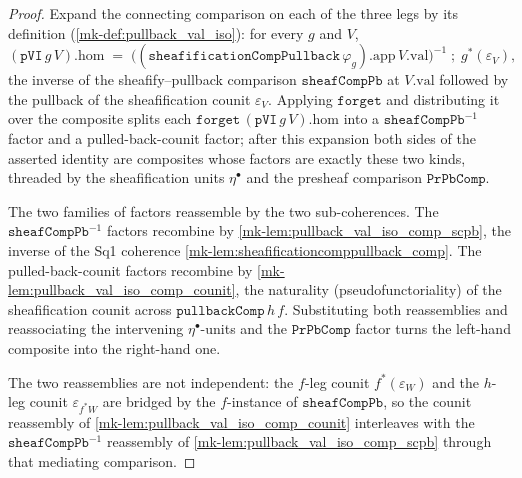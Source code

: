 \begin{proof}
  \leanok
  Expand the connecting comparison on each of the three legs by its definition
  (\ref{mk-def:pullback_val_iso}): for every \(g\) and \(V\),
  \[
    (\mathtt{pVI}\,g\,V).\mathrm{hom} \;=\;
      \bigl((\mathtt{sheafificationCompPullback}\,\varphi_g).\mathrm{app}\,V.\mathrm{val}\bigr)^{-1}
        \;\mathbin{;}\; g^{*}(\varepsilon_V),
  \]
  the inverse of the sheafify--pullback comparison \(\mathtt{sheafCompPb}\) at \(V.\mathrm{val}\)
  followed by the pullback of the sheafification counit \(\varepsilon_V\). Applying
  \(\mathtt{forget}\) and distributing it over the composite splits each
  \(\mathtt{forget}\,(\mathtt{pVI}\,g\,V).\mathrm{hom}\) into a \(\mathtt{sheafCompPb}^{-1}\) factor
  and a pulled-back-counit factor; after this expansion both sides of the asserted identity are
  composites whose factors are exactly these two kinds, threaded by the sheafification units
  \(\eta^\bullet\) and the presheaf comparison \(\mathtt{PrPbComp}\).

  The two families of factors reassemble by the two sub-coherences. The
  \(\mathtt{sheafCompPb}^{-1}\) factors recombine by \ref{mk-lem:pullback_val_iso_comp_scpb}, the
  inverse of the Sq1 coherence \ref{mk-lem:sheafificationcomppullback_comp}. The pulled-back-counit
  factors recombine by \ref{mk-lem:pullback_val_iso_comp_counit}, the naturality
  (pseudofunctoriality) of the sheafification counit across \(\mathtt{pullbackComp}\,h\,f\).
  Substituting both reassemblies and reassociating the intervening \(\eta^\bullet\)-units and the
  \(\mathtt{PrPbComp}\) factor turns the left-hand composite into the right-hand one.

  The two reassemblies are not independent: the \(f\)-leg counit \(f^{*}(\varepsilon_W)\) and the
  \(h\)-leg counit \(\varepsilon_{f^{*}W}\) are bridged by the \(f\)-instance of
  \(\mathtt{sheafCompPb}\), so the counit reassembly of \ref{mk-lem:pullback_val_iso_comp_counit}
  interleaves with the \(\mathtt{sheafCompPb}^{-1}\) reassembly of
  \ref{mk-lem:pullback_val_iso_comp_scpb} through that mediating comparison.
\end{proof}

